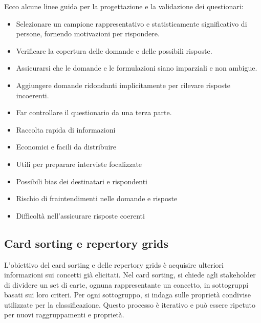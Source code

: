 Ecco alcune linee guida per la progettazione e la validazione dei questionari:

\begin{itemize}
    \item Selezionare un campione rappresentativo e statisticamente significativo
    di persone, fornendo motivazioni per rispondere.
    \item Verificare la copertura delle domande e delle possibili risposte.
    \item Assicurarsi che le domande e le formulazioni siano imparziali e non
    ambigue.
    \item Aggiungere domande ridondanti implicitamente per rilevare risposte
    incoerenti.
    \item Far controllare il questionario da una terza parte.
\end{itemize}

\begin{tcolorbox}[colback=green!5!white,colframe=green!75!black, title=Pro dei questionari]
    \begin{itemize}
        \item Raccolta rapida di informazioni
        \item Economici e facili da distribuire
        \item Utili per preparare interviste focalizzate
    \end{itemize}
\end{tcolorbox}

\begin{tcolorbox}[colback=red!5!white,colframe=red!75!black, title=Contro dei questionari]
    \begin{itemize}
        \item Possibili bias dei destinatari e rispondenti
        \item Rischio di fraintendimenti nelle domande e risposte
        \item Difficoltà nell'assicurare risposte coerenti
    \end{itemize}
\end{tcolorbox}

\subsection{Card sorting e repertory grids}

L'obiettivo del card sorting e delle repertory grids è acquisire ulteriori
informazioni sui concetti già elicitati. Nel card sorting, si chiede agli
stakeholder di dividere un set di carte, ognuna rappresentante un concetto,
in sottogruppi basati sui loro criteri. Per ogni sottogruppo, si indaga sulle 
proprietà condivise utilizzate per la classificazione. Questo processo è 
iterativo e può essere ripetuto per nuovi raggruppamenti e proprietà.

